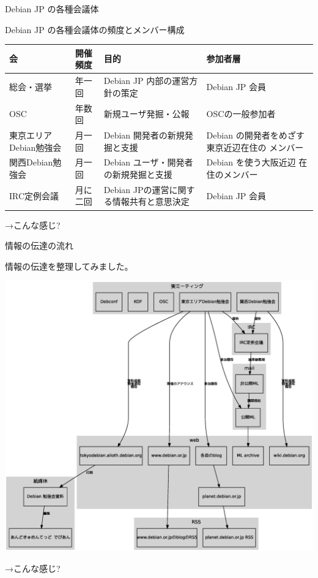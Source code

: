 \documentclass[cjk,dvipdfmx,12pt]{beamer}
\begin{document}
\begin{frame}{Debian JP の各種会議体}

Debian JP の各種会議体の頻度とメンバー構成

{\scriptsize
\begin{tabular}[t]{|p{6em}|l|p{10em}|p{10em}|}
\hline
会 & 開催頻度 & 目的 & 参加者層 \\
\hline
総会・選挙 & 年一回 & Debian JP 内部の運営方針の策定 & Debian JP 会員 \\
OSC & 年数回 & 新規ユーザ発掘・公報 & OSCの一般参加者 \\
東京エリアDebian勉強会 & 月一回 & Debian 開発者の新規発掘と支援 & Debian の開発者をめざす東京近辺在住の
 メンバー \\
関西Debian勉強会 & 月一回 & Debian ユーザ・開発者の新規発掘と支援 & Debian を使う大阪近辺
	     在住のメンバー\\
IRC定例会議 & 月に二回 & Debian JPの運営に関する情報共有と意思決定 & Debian JP
 会員 \\
\hline
\end{tabular}
}

\hfill{}→こんな感じ?
\end{frame}

\begin{frame}{情報の伝達の流れ}

情報の伝達を整理してみました。

\includegraphics[width=0.7\hsize]{image200712/debianjpandmedia.eps}

\hfill{}→こんな感じ?

\end{frame}
\end{document}
